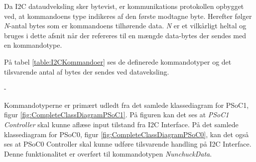 Da I2C dataudveksling sker bytevist, er kommunikations protokollen opbygget ved, at kommandoens type indikeres af den første modtagne byte. Herefter følger \textit{N}-antal bytes som er kommandoens tilhørende data. \textit{N} er et vilkårligt heltal og bruges i dette afsnit når der refereres til en mængde data-bytes der sendes med en kommandotype.

På tabel \ref{table:I2CKommandoer} ses de definerede kommandotyper og det tilsvarende antal af bytes der sendes ved dataveksling.

\begin{table}[H]
	\begin{adjustwidth}{-3cm}{-\rightmargin}
		\centering
		\caption{I2C kommunikation kommandotyper}
		\label{table:I2CKommandoer}
	\end{adjustwidth}
\end{table}

Kommandotyperne er primært udledt fra det samlede klassediagram for PSoC1, figur \ref{fig:CompleteClassDiagramPSoC1}. På figuren kan det ses at \textit{PSoC1 Controller} skal kunne aflæse input tilstand fra I2C Interface. På det samlede klassediagram for PSoC0, figur \ref{fig:CompleteClassDiagramPSoC0}, kan det også ses at PSoC0 Controller skal kunne udføre tilsvarende handling på I2C Interface. Denne funktionalitet er overført til kommandotypen \textit{NunchuckData}.

